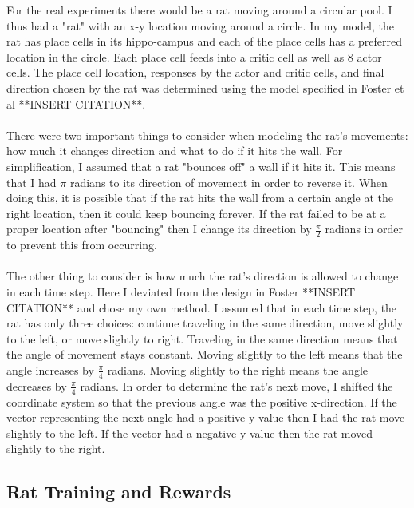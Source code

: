 \documentclass[conference]{IEEEtran}
\begin{document}
For the real experiments there would be a rat moving around a circular pool. I thus had a "rat" with an x-y location moving around a circle. In my model, the rat has place cells in its hippo-campus and each of the place cells has a preferred location in the circle. Each place cell feeds into a critic cell as well as 8 actor cells. The place cell location, responses by the actor and critic cells, and final direction chosen by the rat was determined using the model specified in Foster et al **INSERT CITATION**. \\
\\
There were two important things to consider when modeling the rat's movements: how much it changes direction and what to do if it hits the wall. For simplification, I assumed that a rat "bounces off" a wall if it hits it. This means that I had $\pi$ radians to its direction of movement in order to reverse it. When doing this, it is possible that if the rat hits the wall from a certain angle at the right location, then it could keep bouncing forever. If the rat failed to be at a proper location after "bouncing" then I change its direction by $\frac{\pi}{2}$ radians in order to prevent this from occurring. \\
\\
The other thing to consider is how much the rat's direction is allowed to change in each time step. Here I deviated from the design in Foster **INSERT CITATION** and chose my own method. I assumed that in each time step, the rat has only three choices: continue traveling in the same direction, move slightly to the left, or move slightly to right. Traveling in the same direction means that the angle of movement stays constant. Moving slightly to the left means that the angle increases by $\frac{\pi}{4}$ radians. Moving slightly to the right means the angle decreases by $\frac{\pi}{4}$ radians. In order to determine the rat's next move, I shifted the coordinate system so that the previous angle was the positive x-direction. If the vector representing the next angle had a positive y-value then I had the rat move slightly to the left. If the vector had a negative y-value then the rat moved slightly to the right.

\subsection{Rat Training and Rewards}
\end{document}
